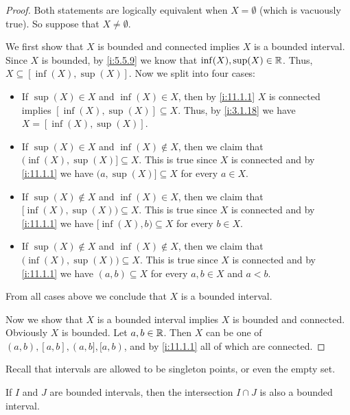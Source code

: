 \begin{proof}
  Both statements are logically equivalent when \(X = \emptyset\) (which is vacuously true).
  So suppose that \(X \neq \emptyset\).

  We first show that \(X\) is bounded and connected implies \(X\) is a bounded interval.
  Since \(X\) is bounded, by \cref{i:5.5.9} we know that \(\inf(X), \sup(X) \in \mathbb{R}\).
  Thus, \(X \subseteq [\inf(X), \sup(X)]\).
  Now we split into four cases:
  \begin{itemize}
    \item If \(\sup(X) \in X\) and \(\inf(X) \in X\), then by \cref{i:11.1.1} \(X\) is connected implies \([\inf(X), \sup(X)] \subseteq X\).
          Thus, by \cref{i:3.1.18} we have \(X = [\inf(X), \sup(X)]\).
    \item If \(\sup(X) \in X\) and \(\inf(X) \notin X\), then we claim that \(\big(\inf(X), \sup(X)] \subseteq X\).
          This is true since \(X\) is connected and by \cref{i:11.1.1} we have \(\big(a, \sup(X)] \subseteq X\) for every \(a \in X\).
    \item If \(\sup(X) \notin X\) and \(\inf(X) \in X\), then we claim that \([\inf(X), \sup(X)\big) \subseteq X\).
          This is true since \(X\) is connected and by \cref{i:11.1.1} we have \([\inf(X), b\big) \subseteq X\) for every \(b \in X\).
    \item If \(\sup(X) \notin X\) and \(\inf(X) \notin X\), then we claim that \(\big(\inf(X), \sup(X)\big) \subseteq X\).
          This is true since \(X\) is connected and by \cref{i:11.1.1} we have \((a, b) \subseteq X\) for every \(a, b \in X\) and \(a < b\).
  \end{itemize}
  From all cases above we conclude that \(X\) is a bounded interval.

  Now we show that \(X\) is a bounded interval implies \(X\) is bounded and connected.
  Obviously \(X\) is bounded.
  Let \(a, b \in \mathbb{R}\).
  Then \(X\) can be one of \((a, b), [a, b], (a, b], [a, b)\), and by \cref{i:11.1.1} all of which are connected.
\end{proof}

\begin{rmk}\label{i:11.1.5}
  Recall that intervals are allowed to be singleton points, or even the empty set.
\end{rmk}

\begin{cor}\label{i:11.1.6}
  If \(I\) and \(J\) are bounded intervals, then the intersection \(I \cap J\) is also a bounded interval.
\end{cor}

